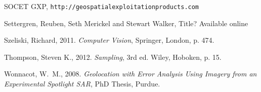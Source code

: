 \documentclass[10pt]{amsart}
\begin{document}
\begin{thebibliography}{99}
SOCET GXP, {\tt http://geospatialexploitationproducts.com}

Settergren, Reuben, Seth Merickel and Stewart Walker, Title?
  Available online \cite{GITHUB}

Szeliski, Richard, 2011. {\em Computer Vision}, Springer,
  London, p. 474.

Thompson, Steven K., 2012. {\em Sampling}, 3rd ed. Wiley, Hoboken,
  p. 15.

Wonnacot, W.~M., 2008. {\em Geolocation with Error Analysis
  Using Imagery from an Experimental Spotlight SAR}, PhD Thesis, Purdue.


\end{thebibliography}
 
\end{document}
